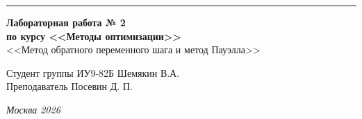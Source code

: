 \documentclass[a4paper, 14pt]{extarticle}
\begin{document}
\begin{titlepage}
\vspace*{-16pt}
\hspace{30pt}\rule{0.866\textwidth}{0.4pt}
  
\vspace{11em}

\begin{center}
\Large {\bf Лабораторная работа № 2} \\ 
\large {\bf по курсу <<Методы оптимизации>>} \\
\large <<Метод обратного переменного шага и метод Пауэлла>> 
\end{center}\normalsize

\vspace{8em}


\begin{flushright}
  {Студент группы ИУ9-82Б Шемякин В.А. \hspace*{15pt}\\ 
  \vspace{2ex}
  Преподаватель Посевин Д. П.\hspace*{15pt}}
\end{flushright}

\bigskip

\vfill
 

\begin{center}
\textsl{Москва 2026}
\end{center}
\end{titlepage}

\renewcommand{\ttdefault}{pcr}

\setlength{\tabcolsep}{3pt}
\newpage
\setcounter{page}{2}
\end{document}
